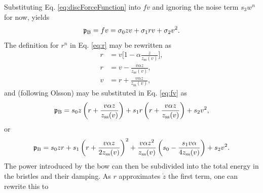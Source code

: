 Substituting Eq. \eqref{eq:discForceFunction} into $fv$ and ignoring the noise term $s_3w^n$ for now, yields
\begin{equation}\label{eq:fv}
    \mathfrak{p}_{\text{B}} = fv = \sigma_{0}zv +\sigma_{1}rv+\sigma_{2}v^2.
\end{equation}
The definition for $r^n$ in Eq. \eqref{eq:r} may be rewritten as
\begin{equation*}
    \begin{aligned}
        r &= v\bigg[1-\alpha\frac{z}{z_\text{ss}(v)}\bigg],\\
        r &= v-\frac{v\alpha z}{z_\text{ss}(v)},\\
        v &= r + \frac{v\alpha z}{z_\text{ss}(v)},
    \end{aligned}
\end{equation*}
and (following Olsson) may be substituted in Eq. \eqref{eq:fv} as
\begin{equation}
    \mathfrak{p}_{\text{B}} = s_{0}z\left(r+ \frac{v\alpha z}{z_\text{ss}(v)}\right)+s_{1}r\left(r+ \frac{v\alpha z}{z_\text{ss}(v)}\right)+s_{2}v^2,
\end{equation}
or
\begin{equation}
    \mathfrak{p}_{\text{B}} = s_0zr+s_1\left(r+\frac{v\alpha z}{2z_\text{ss}(v)}\right)^2+\frac{v\alpha z^2}{z_\text{ss}(v)}\left(s_0-\frac{s_1v\alpha}{4z_\text{ss}(v)}\right)+s_2v^2.
\end{equation}
The power introduced by the bow can then be subdivided into the total energy in the bristles and their damping. As $r$ approximates $\dot z$ the first term, one can rewrite this to 

